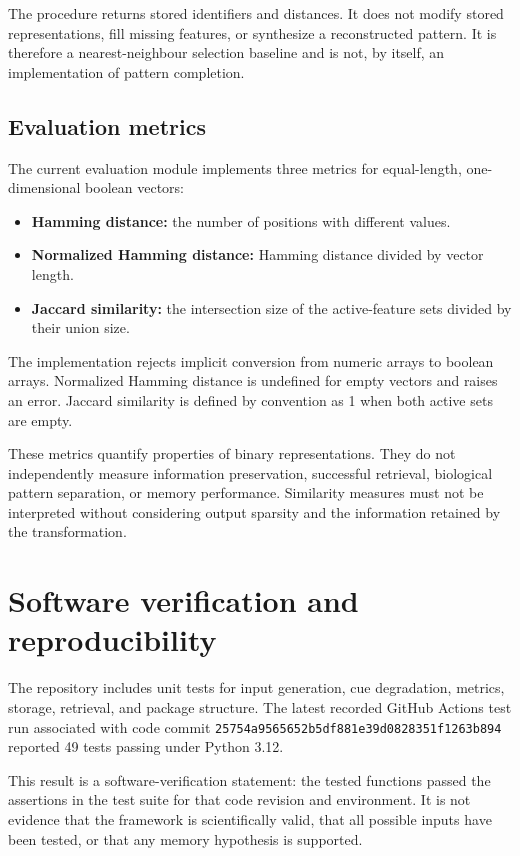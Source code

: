 \documentclass[11pt,a4paper]{article}
\begin{document}
The procedure returns stored identifiers and distances. It does not modify stored representations, fill missing features, or synthesize a reconstructed pattern. It is therefore a nearest-neighbour selection baseline and is not, by itself, an implementation of pattern completion.

\subsection{Evaluation metrics}

The current evaluation module implements three metrics for equal-length, one-dimensional boolean vectors:
\begin{itemize}
    \item \textbf{Hamming distance:} the number of positions with different values.
    \item \textbf{Normalized Hamming distance:} Hamming distance divided by vector length.
    \item \textbf{Jaccard similarity:} the intersection size of the active-feature sets divided by their union size.
\end{itemize}
The implementation rejects implicit conversion from numeric arrays to boolean arrays. Normalized Hamming distance is undefined for empty vectors and raises an error. Jaccard similarity is defined by convention as 1 when both active sets are empty.

These metrics quantify properties of binary representations. They do not independently measure information preservation, successful retrieval, biological pattern separation, or memory performance. Similarity measures must not be interpreted without considering output sparsity and the information retained by the transformation.

\section{Software verification and reproducibility}

The repository includes unit tests for input generation, cue degradation, metrics, storage, retrieval, and package structure. The latest recorded GitHub Actions test run associated with code commit \texttt{25754a9565652b5df881e39d0828351f1263b894} reported 49 tests passing under Python 3.12.

This result is a software-verification statement: the tested functions passed the assertions in the test suite for that code revision and environment. It is not evidence that the framework is scientifically valid, that all possible inputs have been tested, or that any memory hypothesis is supported.
\end{document}
